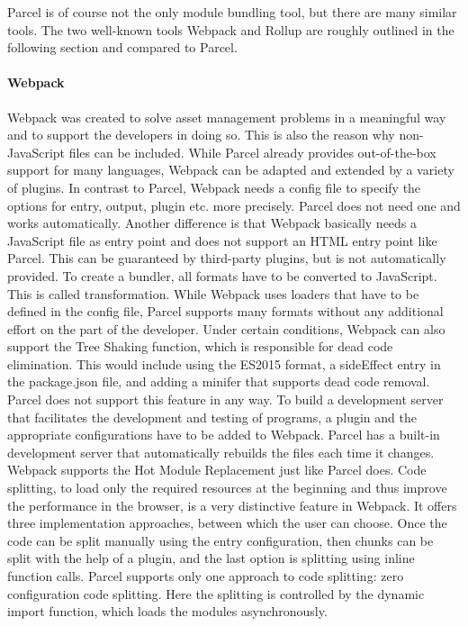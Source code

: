 Parcel is of course not the only module bundling tool, but there are many similar tools. The two well-known tools Webpack and Rollup are roughly outlined in the following section and compared to Parcel.

\paragraph{Webpack}
\label{par:tecWebpack}
Webpack was created to solve asset management problems in a meaningful way and to support the developers in doing so. This is also the reason why non-JavaScript files can be included. While Parcel already provides out-of-the-box support for many languages, Webpack can be adapted and extended by a variety of plugins. In contrast to Parcel, Webpack needs a config file to specify the options for entry, output, plugin etc. more precisely. Parcel does not need one and works automatically. Another difference is that Webpack basically needs a JavaScript file as entry point and does not support an HTML entry point like Parcel. This can be guaranteed by third-party plugins, but is not automatically provided. To create a bundler, all formats have to be converted to JavaScript. This is called transformation. While Webpack uses loaders that have to be defined in the config file, Parcel supports many formats without any additional effort on the part of the developer. Under certain conditions, Webpack can also support the Tree Shaking function, which is responsible for dead code elimination. This would include using the ES2015 format, a sideEffect entry in the package.json file, and adding a minifer that supports dead code removal. Parcel does not support this feature in any way. To build a development server that facilitates the development and testing of programs, a plugin and the appropriate configurations have to be added to Webpack. Parcel has a built-in development server that automatically rebuilds the files each time it changes. Webpack supports the Hot Module Replacement just like Parcel does. Code splitting, to load only the required resources at the beginning and thus improve the performance in the browser, is a very distinctive feature in Webpack. It offers three implementation approaches, between which the user can choose. Once the code can be split manually using the entry configuration, then chunks can be split with the help of a plugin, and the last option is splitting using inline function calls. Parcel supports only one approach to code splitting: zero configuration code splitting. Here the splitting is controlled by the dynamic import function, which loads the modules asynchronously.

